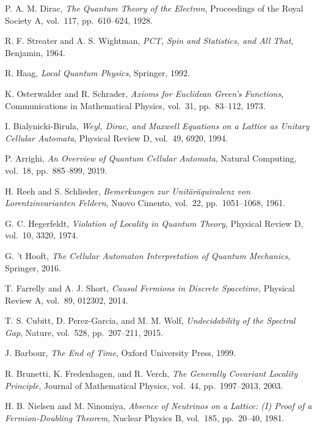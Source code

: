 \documentclass[11pt]{article}
\theoremstyle{definition}
\theoremstyle{remark}
\begin{document}
\begin{thebibliography}{99}

P. A. M. Dirac,
\textit{The Quantum Theory of the Electron},
Proceedings of the Royal Society A, vol.~117, pp.~610--624, 1928.

R. F. Streater and A. S. Wightman,
\textit{PCT, Spin and Statistics, and All That},
Benjamin, 1964.

R. Haag,
\textit{Local Quantum Physics},
Springer, 1992.

K. Osterwalder and R. Schrader,
\textit{Axioms for Euclidean Green's Functions},
Communications in Mathematical Physics, vol.~31, pp.~83--112, 1973.

I. Bialynicki-Birula,
\textit{Weyl, Dirac, and Maxwell Equations on a Lattice as Unitary Cellular Automata},
Physical Review D, vol.~49, 6920, 1994.

P. Arrighi,
\textit{An Overview of Quantum Cellular Automata},
Natural Computing, vol.~18, pp.~885--899, 2019.

H. Reeh and S. Schlieder,
\textit{Bemerkungen zur Unitäräquivalenz von Lorentzinvarianten Feldern},
Nuovo Cimento, vol.~22, pp.~1051--1068, 1961.

G. C. Hegerfeldt,
\textit{Violation of Locality in Quantum Theory},
Physical Review D, vol.~10, 3320, 1974.

G. 't Hooft,
\textit{The Cellular Automaton Interpretation of Quantum Mechanics},
Springer, 2016.

T. Farrelly and A. J. Short,
\textit{Causal Fermions in Discrete Spacetime},
Physical Review A, vol.~89, 012302, 2014.

T. S. Cubitt, D. Perez-Garcia, and M. M. Wolf,
\textit{Undecidability of the Spectral Gap},
Nature, vol.~528, pp.~207--211, 2015.

J. Barbour,
\textit{The End of Time},
Oxford University Press, 1999.

R. Brunetti, K. Fredenhagen, and R. Verch,
\textit{The Generally Covariant Locality Principle},
Journal of Mathematical Physics, vol.~44, pp.~1997--2013, 2003.

H. B. Nielsen and M. Ninomiya,
\textit{Absence of Neutrinos on a Lattice: (I) Proof of a Fermion-Doubling Theorem},
Nuclear Physics B, vol.~185, pp.~20--40, 1981.


\end{thebibliography}
\end{document}
